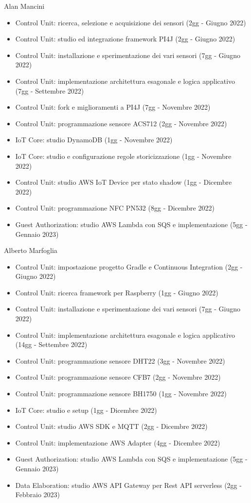 Alan Mancini
\begin{itemize}
    \item Control Unit: ricerca, selezione e acquisizione dei sensori (2gg - Giugno 2022)
    \item Control Unit: studio ed integrazione framework PI4J (2gg - Giugno 2022) 
    \item Control Unit: installazione e sperimentazione dei vari sensori (7gg - Giugno 2022)
    \item Control Unit: implementazione architettura esagonale e logica applicativo (7gg - Settembre 2022)
    \item Control Unit: fork e miglioramenti a PI4J (7gg - Novembre 2022)
    \item Control Unit: programmazione sensore ACS712 (2gg - Novembre 2022)
    \item IoT Core: studio DynamoDB (1gg - Novembre 2022)
    \item IoT Core: studio e configurazione regole storicizzazione (1gg - Novembre 2022)
    \item Control Unit: studio AWS IoT Device per stato shadow (1gg - Dicembre 2022)
    \item Control Unit: programmazione NFC PN532 (8gg - Dicembre 2022)
    \item Guest Authorization: studio AWS Lambda con SQS e implementazione (5gg - Gennaio 2023)
\end{itemize}

Alberto Marfoglia
\begin{itemize}
    \item Control Unit: impostazione progetto Gradle e Continuous Integration (2gg - Giugno 2022) 
    \item Control Unit: ricerca framework per Raspberry (1gg - Giugno 2022) 
    \item Control Unit: installazione e sperimentazione dei vari sensori (7gg - Giugno 2022)
    \item Control Unit: implementazione architettura esagonale e logica applicativo (14gg - Settembre 2022)
    \item Control Unit: programmazione sensore DHT22 (3gg - Novembre 2022)
    \item Control Unit: programmazione sensore CFB7 (2gg - Novembre 2022)
    \item Control Unit: programmazione sensore BH1750 (1gg - Novembre 2022)
    \item IoT Core: studio e setup (1gg - Dicembre 2022)
    \item Control Unit: studio AWS SDK e MQTT (2gg - Dicembre 2022)
    \item Control Unit: implementazione AWS Adapter (4gg - Dicembre 2022)
    \item Guest Authorization: studio AWS Lambda con SQS e implementazione (5gg - Gennaio 2023)
    \item Data Elaboration: studio AWS API Gateway per Rest API serverless (2gg - Febbraio 2023)
\end{itemize}

